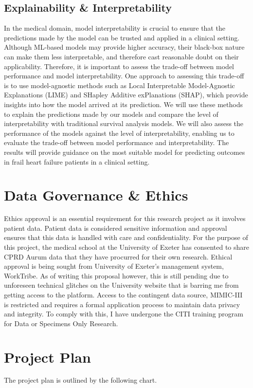 \documentclass[%
 reprint,
 amsmath,amssymb,
 aps,
 nofootinbib
]{revtex4-2}
\theoremstyle{definition}
\begin{document}
\subsection{\label{expla}Explainability \& Interpretability}
In the medical domain, model interpretability is crucial to ensure that the predictions made by the model can be trusted and applied in a clinical setting. Although ML-based models may provide higher accuracy, their black-box nature can make them less interpretable, and therefore cast reasonable doubt on their applicability. Therefore, it is important to assess the trade-off between model performance and model interpretability. One approach to assessing this trade-off is to use model-agnostic methods such as Local Interpretable Model-Agnostic Explanations (LIME) and SHapley Additive exPlanations (SHAP), which provide insights into how the model arrived at its prediction. We will use these methods to explain the predictions made by our models and compare the level of interpretability with traditional survival analysis models. We will also assess the performance of the models against the level of interpretability, enabling us to evaluate the trade-off between model performance and interpretability. The results will provide guidance on the most suitable model for predicting outcomes in frail heart failure patients in a clinical setting.

\section{\label{gov}Data Governance \& Ethics}
Ethics approval is an essential requirement for this research project as it involves patient data. Patient data is considered sensitive information and approval ensures that this data is handled with care and confidentiality. For the purpose of this project, the medical school at the University of Exeter has consented to share CPRD Aurum data that they have procurred for their own research. Ethical approval is being sought from University of Exeter's management system, WorkTribe. As of writing this proposal however, this is still pending due to unforeseen technical glitches on the University website that is barring me from getting access to the platform. Access to the contingent data source, MIMIC-III is restricted and requires a formal application process to maintain data privacy and integrity. To comply with this, I have undergone the CITI training program for Data or Specimens Only Research.
\\
\section{\label{plan}Project Plan}
The project plan is outlined by the following chart.
\end{document}

